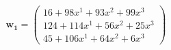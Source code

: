 \documentclass[preview]{standalone}
\begin{document}
\begin{align*}
\mathbf{w_1} = \begin{pmatrix}16 + 98x^{1} + 93x^{2} + 99x^{3} \\ 124 + 114x^{1} + 56x^{2} + 25x^{3} \\ 45 + 106x^{1} + 64x^{2} + 6x^{3}\end{pmatrix}
\end{align*}
\end{document}
